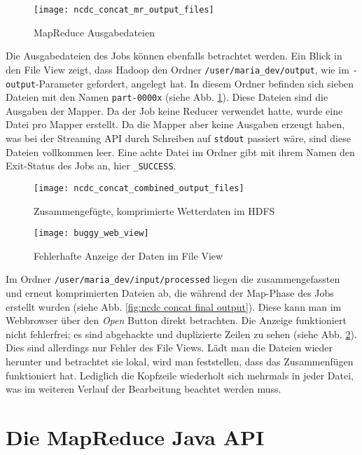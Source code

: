 \begin{figure}[ht]
    \centering
    \texttt{[image: ncdc\_concat\_mr\_output\_files]}
    \caption[MapReduce Ausgabedateien]{MapReduce Ausgabedateien}
    \label{fig:ncdc concat mr output}
\end{figure}

Die Ausgabedateien des Jobs können ebenfalls betrachtet werden. Ein Blick in den File View zeigt, dass Hadoop den Ordner \verb|/user/maria_dev/output|, wie im \verb|-output|-Parameter gefordert, angelegt hat. In diesem Ordner befinden sich sieben Dateien mit den Namen \verb|part-0000x| (siehe Abb. \ref{fig:ncdc concat mr output}). Diese Dateien sind die Ausgaben der Mapper. Da der Job keine Reducer verwendet hatte, wurde eine Datei pro Mapper erstellt. Da die Mapper aber keine Ausgaben erzeugt haben, was bei der Streaming API durch Schreiben auf \verb|stdout| passiert wäre, sind diese Dateien vollkommen leer. Eine achte Datei im Ordner gibt mit ihrem Namen den Exit-Status des Jobs an, hier \verb|_SUCCESS|.

\begin{figure}[ht]
    \centering
    \texttt{[image: ncdc\_concat\_combined\_output\_files]}
    \caption[Zusammengefügte, komprimierte Wetterdaten im HDFS]{Zusammengefügte, komprimierte Wetterdaten im HDFS}
    \label{fig:ncdc concat final output}
    \texttt{[image: buggy\_web\_view]}
    \caption[Fehlerhafte Anzeige der Daten im File View]{Fehlerhafte Anzeige der Daten im File View}
    \label{fig:buggy web output}
\end{figure}

Im Ordner \verb|/user/maria_dev/input/processed| liegen die zusammengefassten und erneut komprimierten Dateien ab, die während der Map-Phase des Jobs erstellt wurden (siehe Abb. \ref{fig:ncdc concat final output}). Diese kann man im Webbrowser über den \textit{Open} Button direkt betrachten. Die Anzeige funktioniert nicht fehlerfrei; es sind abgehackte und duplizierte Zeilen zu sehen (siehe Abb. \ref{fig:buggy web output}). Dies sind allerdings nur Fehler des File Views. Lädt man die Dateien wieder herunter und betrachtet sie lokal, wird man feststellen, dass das Zusammenfügen funktioniert hat. Lediglich die Kopfzeile wiederholt sich mehrmals in jeder Datei, was im weiteren Verlauf der Bearbeitung beachtet werden muss.
\pagebreak

\section{Die MapReduce Java API}
\label{chap:fund sec:core sub:handson mapred java}
